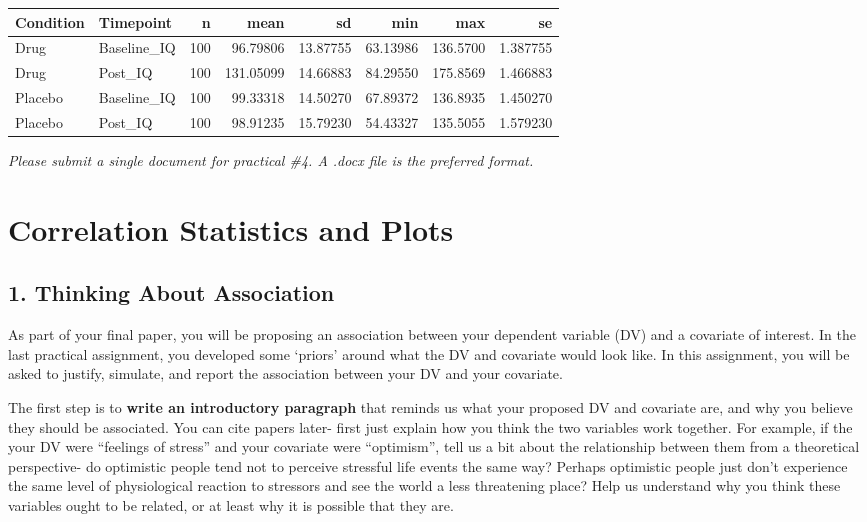 \documentclass[
]{book}
\begin{document}
\begin{tabular}{l|l|r|r|r|r|r|r}
\hline
Condition & Timepoint & n & mean & sd & min & max & se\\
\hline
Drug & Baseline\_IQ & 100 & 96.79806 & 13.87755 & 63.13986 & 136.5700 & 1.387755\\
\hline
Drug & Post\_IQ & 100 & 131.05099 & 14.66883 & 84.29550 & 175.8569 & 1.466883\\
\hline
Placebo & Baseline\_IQ & 100 & 99.33318 & 14.50270 & 67.89372 & 136.8935 & 1.450270\\
\hline
Placebo & Post\_IQ & 100 & 98.91235 & 15.79230 & 54.43327 & 135.5055 & 1.579230\\
\hline
\end{tabular}

\emph{Please submit a single document for practical \#4. A .docx file is the preferred format.}

\chapter{Correlation Statistics and Plots}\label{correlation-statistics-and-plots}

\section*{1. Thinking About Association}\label{thinking-about-association}

As part of your final paper, you will be proposing an association between your dependent variable (DV) and a covariate of interest. In the last practical assignment, you developed some `priors' around what the DV and covariate would look like. In this assignment, you will be asked to justify, simulate, and report the association between your DV and your covariate.

The first step is to \textbf{write an introductory paragraph} that reminds us what your proposed DV and covariate are, and why you believe they should be associated. You can cite papers later- first just explain how you think the two variables work together. For example, if the your DV were ``feelings of stress'' and your covariate were ``optimism'', tell us a bit about the relationship between them from a theoretical perspective- do optimistic people tend not to perceive stressful life events the same way? Perhaps optimistic people just don't experience the same level of physiological reaction to stressors and see the world a less threatening place? Help us understand why you think these variables ought to be related, or at least why it is possible that they are.
\end{document}
